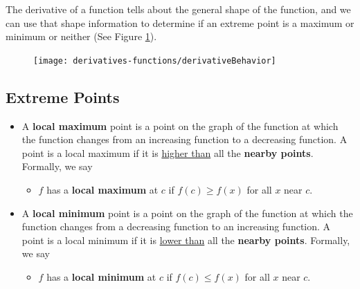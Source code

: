 \noindent The derivative of a function tells about the general shape of the function, and we can use that shape information to determine if an extreme point is a maximum or minimum or neither (See Figure \ref{fig:dervBeh2}).

\begin{figure}[h]
    \centering
    \caption{} \footnotemark
    \texttt{[image: derivatives-functions/derivativeBehavior]} 
    \label{fig:dervBeh2}
\end{figure}


\subsection*{Extreme Points}

\begin{tcolorbox}[title = {Local Extreme Points }]
\begin{itemize}[leftmargin=*]
    \item A \textbf{local maximum} point is a point on the graph of the function at which the function changes from an increasing function to a decreasing function. A point is a local maximum if it is \underline{higher than} all the \textbf{nearby points}. Formally, we say
    \begin{itemize}
        \item $f$ has a \textbf{local maximum} at $c$ if $f(c)\ge f(x)$ for all $x$ near $c$.
    \end{itemize}
    \item A \textbf{local minimum} point is a point on the graph of the function at which the function changes from a decreasing function to an increasing function. A point is a local minimum if it is \underline{lower than} all the \textbf{nearby points}. Formally, we say
    \begin{itemize}
        \item $f$ has a \textbf{local minimum} at $c$ if $f(c)\le f(x)$ for all $x$ near $c$.
    \end{itemize}
\end{itemize}
\end{tcolorbox}
\vspace{-0.5cm}
